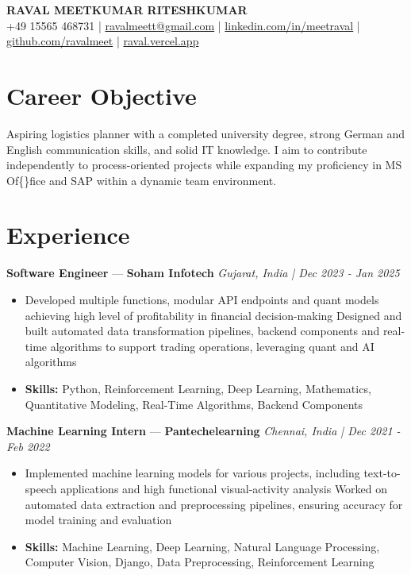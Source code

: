 \documentclass[a4paper,10pt]{article}
\begin{document}
\begin{center}
  {\Large\bfseries RAVAL MEETKUMAR RITESHKUMAR}\\[2pt]
  {\small +49 15565 468731 \;|\; \href{mailto:ravalmeett@gmail.com}{ravalmeett@gmail.com} \;|\; \href{https://www.linkedin.com/in/meetraval/}{linkedin.com/in/meetraval} \;|\; \href{https://github.com/ravalmeet}{github.com/ravalmeet} \;|\; \href{https://raval.vercel.app/}{raval.vercel.app}}
\end{center}
\vspace{-3pt}

\section*{Career Objective}
Aspiring logistics planner with a completed university degree, strong German and English communication skills, and solid IT knowledge. I aim to contribute independently to process-oriented projects while expanding my proficiency in MS Of\{\}fice and SAP within a dynamic team environment.\par

\section*{Experience}
\textbf{Software Engineer} — \textbf{Soham Infotech} \hfill \textit{Gujarat, India \;|\; Dec 2023 - Jan 2025}\par
\vspace{1pt}
\begin{itemize}
  \item Developed multiple functions, modular API endpoints and quant models achieving high level of profitability in financial decision-making Designed and built automated data transformation pipelines, backend components and real-time algorithms to support trading operations, leveraging quant and AI algorithms
  \item \textbf{Skills:} Python, Reinforcement Learning, Deep Learning, Mathematics, Quantitative Modeling, Real-Time Algorithms, Backend Components
\end{itemize}
\vspace{3pt}
\textbf{Machine Learning Intern} — \textbf{Pantechelearning} \hfill \textit{Chennai, India \;|\; Dec 2021 - Feb 2022}\par
\vspace{1pt}
\begin{itemize}
  \item Implemented machine learning models for various projects, including text-to-speech applications and high functional visual-activity analysis Worked on automated data extraction and preprocessing pipelines, ensuring accuracy for model training and evaluation
  \item \textbf{Skills:} Machine Learning, Deep Learning, Natural Language Processing, Computer Vision, Django, Data Preprocessing, Reinforcement Learning
\end{itemize}
\end{document}
